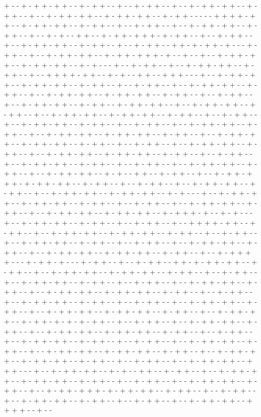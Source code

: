 + - - + - + + - + + - - + - + + - - + - - + - + + - - + - - + - + + - + + - - + - + + - - + - - + - + + - + + - - + - + + - + + - - + - + + - - - - - + + + + - + + - - + - + + - + + - - + - + + - - + - - + - + + - - + - - + - + + - + + - - + - + + - - + - - + - + - - + + - - + - + + - + + + - + - + + - - + - - + - + + - - + - - + - + + - + + - - + - + + - - + - - + - + + - - + + - + - + + - + - - - + - + + - - + - - + - + + - + + - - + - + + - + + + - + - - + - - + - - + - + + - + + - - + - + + - + + - - + - + - - - + - - + - + + - - + - - + - + + - + + - - + - + + - - + - - + + + + - + + - - + - + - - + + - - + + + - - - + - - + - + + - + + - - + - + + - + + - - + - + + - - + - - + - + + - - + - - + - + + - + + - - + - + + - - + - - + - + + - + + - - + - + + - + + - - + - + + - - + - - + - + + - - + - - + - + + - + + - - + - + + - - + - + + - + + - - + - - + - + + - + + - - + - + + - - + - - + - + + - + + - - + - + + - + + - - + - + + - - + - - + - + + - - + - - + - + + - + + - - + - + + - - + - - + - + + - - + - - + - + + - + + - - + - + + - - + - - + - + + - + + - - + - + + - + + - - + - + + - - + - - + - + + - + + - - + - + + - + + - - + - + + - - + - - + - + + - - + - - + - + + - + + - - + - + + - - + - - + - + + - + + - - + - + + - + + - - + - + + - - + - - + - + + - - + - - + - + + - + + - - + - + + - - + - - + - + + - - + - - + - + + - + + - - + - + + - - + - - + - + + - + + - - + - + - - + + - - + - + + - - + - - + - + + - + + + - + - + + - + + - - + - + + - - + - - + - + + - - + - - + - + + - + + - - + - + + - - + - - + - + + - + + - - + - + + - + + - - + - + - - - + - - + - + + - + + - - + - + + - + + - - + - + + - - + - - + - + + - - + - - + - + + - + + - - + - + + - - + - - + - + + - + + - - + - + + - + + - - + - + + + - + - - + - + - - - + - - + - + + - + + - - + - + + - - + - - + - + + - - + - - + + + + - + + - - + - + + - - + - - + - + + - + + - - + - + + - + + - - + - + + - - + - - + - + + - - + - - + - + + - + + - - + - + + - - + - - + - + + - - + - - + - + + - + + - - + - + + - - + - - + - + + - + + - - + - + + - + + - - + - + + - - + - - + - + + + + - - - + - + + - + - - - + - + + - - + - - + - + + - - + + - + - + + - + + - - + - + + - - + - - + - + + - + + - - + - + + - + + - - + - + + - - + - - + - + + - - + - - + - + + - + + - - + - + + - - + - - + - + + - - + - - + - + + - + + - - + - + + - - + - - + - + + - + + - - + - + + - + + - - + - + + - - + - - + - + + - - + - - + - + + - + + - - + - + + - - + - - + - + + - - + - - + - + + - + + - - + - + + - - + - - + - + + - + + - - + - + + - + + - - + - + + - - + - - + - + + - + + - - + - + + - + - + - + - + + - - + - - + - + + - - + - - + - + + - + + - - + - + + - - + - - + - + + - + + - - + - + + - + + - - + - + + - - + - - + - + + - - + - - + - + + - + + - - + - + + - - + - - + - + + - - + - - + - + + - + + - - + - + + - - + - - + - + + - + + - - + - + + - + + - - + - + + - - + - - + - + + - + + - - + - + + - + + - - + - + + - - + - - + - + + - - + - - + - + + - + + - - + + + - - - + - - + - + + - + + - - + - + - - + + - - + - + + - - + - - + - + + - + + - - + - + + - + + - - + - + + - - + - - + - + + - - + - - + - + + - + + - - + - + + - - + - - + - + + - + + + - + - + + - + + - - + - + + - - + - - + - + + - - + - - + - + + - + + - - + - + + - - + - - + - + + - - + - - + - + + - + + - - + + + + - - + - - 